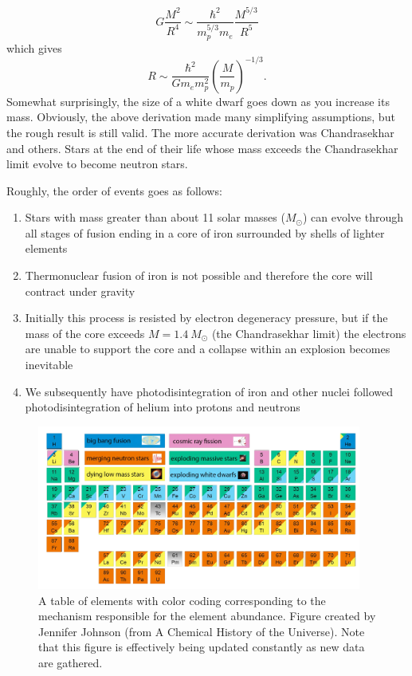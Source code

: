 \documentclass[a4paper,12pt]{article}
\theoremstyle{remark}
\renewcommand{\=}[1]{\stackrel{#1}{=}} %
\theoremstyle{plain}
\theoremstyle{definition}
\newtheorem*{definitionT}{Note}%
\newenvironment{note}{
\begin{dBox}
\begin{definitionT}}
{\end{definitionT}
\end{dBox}}
\begin{document}
\begin{equation}
G \frac{M^2}{R^4} \sim \frac{\hbar^2}{m_p^{5/3} m_e} \frac{M^{5/3}}{R^5}
\end{equation}
which gives
\begin{equation}
R \sim \frac{\hbar ^2}{G m_e m_p^2} \left( \frac{M}{m_p} \right)^{-1/3}.
\end{equation}
Somewhat surprisingly, the size of a white dwarf goes down as you increase its mass. Obviously, the above derivation made many simplifying assumptions, but the rough result is still valid. The more accurate derivation was Chandrasekhar and others. Stars at the end of their life whose mass exceeds the Chandrasekhar limit evolve to become neutron stars.

Roughly, the order of events goes as follows:
\begin{enumerate}
\item Stars with mass greater than about 11 solar masses ($M_\odot$) can evolve through all stages of fusion ending in a core of iron surrounded by shells of lighter elements
\item Thermonuclear fusion of iron is not possible and therefore the core will contract under gravity
\item Initially this process is resisted by electron degeneracy pressure, but if the mass of the core exceeds $M = 1.4 \: M_\odot$ (the Chandrasekhar limit) the electrons are unable to support the core and a collapse within an explosion becomes inevitable
\item We subsequently have photodisintegration of iron and other nuclei followed photodisintegration of helium into protons and neutrons
\end{enumerate}


\begin{figure}[t]
\begin{center}
    \includegraphics*[angle=0,width=0.95\textwidth]{img/origin_of_elements.png}
    \caption[The origin of elements]{A table of elements with color coding corresponding to the mechanism responsible for the element abundance. Figure created by Jennifer Johnson (from A Chemical History of the Universe). Note that this figure is effectively being updated constantly as new data are gathered.}
\label{fig:fig1}
\end{center}
\end{figure}
\end{document}
